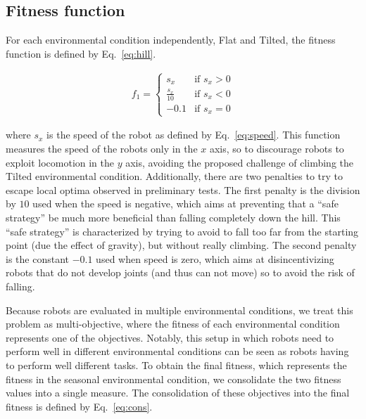 \documentclass[utf8]{frontiersSCNS} %
\begin{document}
 
    
 \subsection{Fitness function }
 \label{sec:fitness}

For each environmental condition independently, Flat and Tilted, the fitness function is defined by Eq.~\eqref{eq:hill}. 
 

\begin{equation}
\begin{gathered}
        f_1 = \begin{cases}
       s_x &\text{if } s_x > 0  \\
        \frac{s_x}{10} & \text{if } s_x < 0\\
         -0.1  & \text{if } s_x = 0 
      \end{cases}                              
  \end{gathered}
\label{eq:hill}
\end{equation}

\noindent where $s_x$ is the speed of the robot as defined by Eq.~\eqref{eq:speed}. This function measures the speed of the robots only in the $x$ axis, so to discourage robots to exploit locomotion in the $y$ axis, avoiding the proposed challenge of climbing the Tilted environmental condition. Additionally, there are two penalties to try to escape local optima observed in preliminary tests. The first penalty is the division by $10$ used when the speed is negative, which aims at preventing that a ``safe strategy'' be much more beneficial than falling completely down the hill. This ``safe strategy'' is characterized by trying to avoid to fall too far from the starting point (due the effect of gravity), but without really climbing. The second penalty is the constant $-0.1$ used when speed is zero, which aims at disincentivizing robots that do not develop joints (and thus can not move) so to  avoid the risk of falling. 

Because robots are evaluated in multiple environmental conditions, we treat this problem as multi-objective, where the fitness of each environmental condition represents one of the objectives. Notably, this setup in which robots need to perform well in different environmental conditions can be seen as robots having to perform well different tasks. To obtain the final fitness, which represents the fitness in the seasonal environmental condition, we consolidate the two fitness values into a single measure. The consolidation of these objectives into the final fitness is defined by Eq.~\eqref{eq:cons}.
     
\end{document}
